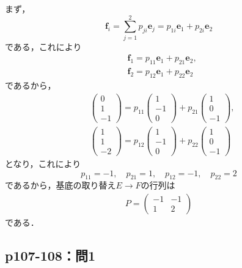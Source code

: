 \documentclass[uplatex,dvipdfmx,a4paper,11pt,fleqn]{jsarticle}
\begin{document}
\begin{leftbar}
まず，
\begin{equation*}
\bm{f}_i=\sum^{2}_{j=1}p_{ji}\bm{e}_{j}=p_{1i}\bm{e}_1+p_{2i}\bm{e}_2
\end{equation*}
である，これにより
\begin{align*}
& \bm{f}_1=p_{11}\bm{e}_1+p_{21}\bm{e}_2, \\
& \bm{f}_2=p_{12}\bm{e}_1+p_{22}\bm{e}_2 
\end{align*}
であるから，
\begin{align*}
&
\begin{pmatrix}
0 \\
1 \\
-1 
\end{pmatrix}
=
p_{11}
\begin{pmatrix}
1 \\
-1 \\
0 
\end{pmatrix}
+p_{21}
\begin{pmatrix}
1 \\
0 \\
-1 
\end{pmatrix}
,\\ 
&
\begin{pmatrix}
1 \\
1 \\
-2 
\end{pmatrix}
=
p_{12}
\begin{pmatrix}
1 \\
-1 \\
0 
\end{pmatrix}
+p_{22}
\begin{pmatrix}
1 \\
0 \\
-1 
\end{pmatrix}
\end{align*}
となり，これにより
\[
p_{11}=-1,\quad p_{21}=1,\quad p_{12}=-1,\quad p_{22}=2
\]
であるから，基底の取り替え$E \to F$の行列は
\begin{align*}
P=
\begin{pmatrix}
-1 & -1 \\
1 & 2 
\end{pmatrix}
\end{align*}
である．
\end{leftbar}

\newpage 
\subsection*{p107-108：問1}
\end{document}
